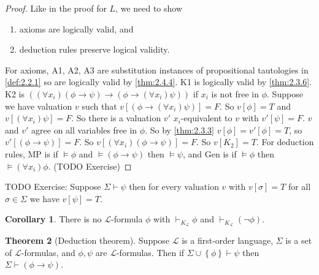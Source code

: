 \documentclass{article}
\renewcommand{\L}{\mathcal{L}}
\newcommand{\rb}[1]{\left( #1 \right)}
\renewcommand{\sb}[1]{\left[ #1 \right]}
\newcommand{\cb}[1]{\left\{ #1 \right\}}
\newcommand{\notb}[1]{\rb{\neg #1}}
\newcommand{\impb}[2]{\rb{#1 \rightarrow #2}}
\newcommand{\fab}[1]{\rb{\forall #1}}
\theoremstyle{definition}\newtheorem{definition}{Definition}[subsection]
\theoremstyle{definition}\newtheorem{remark}[definition]{Remark}
\theoremstyle{definition}\newtheorem*{example}{Example}
\theoremstyle{definition}\newtheorem*{note}{Note}
\newtheorem{theorem}[definition]{Theorem}
\newtheorem{corollary}[definition]{Corollary}
\begin{document}
\begin{proof}
Like in the proof for $ L $, we need to show
\begin{enumerate}
\item axioms are logically valid, and
\item deduction rules preserve logical validity.
\end{enumerate}
For axioms, A1, A2, A3 are substitution instances of propositional tautologies in \ref{def:2.2.1} so are logically valid by \ref{thm:2.4.4}. K1 is logically valid by \ref{thm:2.3.6}. K2 is $ \impb{\fab{x_i}\impb{\phi}{\psi}}{\impb{\phi}{\fab{x_i}\psi}} $ if $ x_i $ is not free in $ \phi $. Suppose we have valuation $ v $ such that $ v\sb{\impb{\phi}{\fab{x_i}\psi}} = F $. So $ v\sb{\phi} = T $ and $ v\sb{\fab{x_i}\psi} = F $. So there is a valuation $ v' $ $ x_i $-equivalent to $ v $ with $ v'\sb{\psi} = F $. $ v $ and $ v' $ agree on all variables free in $ \phi $. So by \ref{thm:2.3.3} $ v\sb{\phi} = v'\sb{\phi} = T $, so $ v'\sb{\impb{\phi}{\psi}} = F $. So $ v\sb{\fab{x_i}\impb{\phi}{\psi}} = F $. So $ v\sb{K_2} = T $. For deduction rules, MP is if $ \vDash \phi $ and $ \vDash \impb{\phi}{\psi} $ then $ \vDash \psi $, and Gen is if $ \vDash \phi $ then $ \vDash \fab{x_i}\phi $. (TODO Exercise)
\end{proof}

TODO Exercise: Suppose $ \Sigma \vdash \psi $ then for every valuation $ v $ with $ v\sb{\sigma} = T $ for all $ \sigma \in \Sigma $ we have $ v\sb{\psi} = T $.

\begin{corollary}
There is no $ \L $-formula $ \phi $ with $ \vdash_{K_{\L}} \phi $ and $ \vdash_{K_{\L}} \notb{\phi} $.
\end{corollary}

\begin{theorem}[Deduction theorem]
Suppose $ \L $ is a first-order language, $ \Sigma $ is a set of $ \L $-formulas, and $ \phi, \psi $ are $ \L $-formulas. Then if $ \Sigma \cup \cb{\phi} \vdash \psi $ then $ \Sigma \vdash \impb{\phi}{\psi} $.
\end{theorem}
\end{document}
